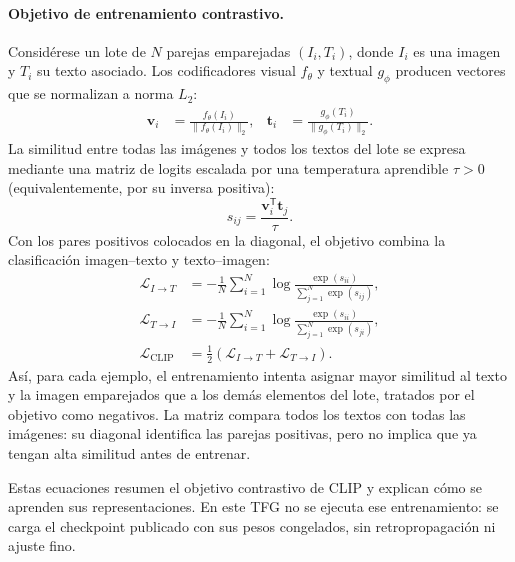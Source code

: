 \paragraph{Objetivo de entrenamiento contrastivo.}
Considérese un lote de \(N\) parejas emparejadas \((I_i,T_i)\), donde \(I_i\) es una imagen y \(T_i\) su texto asociado. Los codificadores visual \(f_\theta\) y textual \(g_\phi\) producen vectores que se normalizan a norma \(L_2\):
\begin{align}
  \mathbf{v}_i &= \frac{f_\theta(I_i)}{\lVert f_\theta(I_i)\rVert_2},
  &
  \mathbf{t}_i &= \frac{g_\phi(T_i)}{\lVert g_\phi(T_i)\rVert_2}.
  \label{eq:clip-normalizacion}
\end{align}
La similitud entre todas las imágenes y todos los textos del lote se expresa mediante una matriz de logits escalada por una temperatura aprendible \(\tau>0\) (equivalentemente, por su inversa positiva):
\begin{equation}
  s_{ij}=\frac{\mathbf{v}_i^{\mathsf T}\mathbf{t}_j}{\tau}.
  \label{eq:clip-logits}
\end{equation}
Con los pares positivos colocados en la diagonal, el objetivo combina la clasificación imagen--texto y texto--imagen:
\begin{align}
  \mathcal{L}_{I\to T}
  &=-\frac{1}{N}\sum_{i=1}^{N}
    \log\frac{\exp(s_{ii})}{\sum_{j=1}^{N}\exp(s_{ij})},
  \\
  \mathcal{L}_{T\to I}
  &=-\frac{1}{N}\sum_{i=1}^{N}
    \log\frac{\exp(s_{ii})}{\sum_{j=1}^{N}\exp(s_{ji})},
  \\
  \mathcal{L}_{\mathrm{CLIP}}
  &=\frac{1}{2}\left(\mathcal{L}_{I\to T}+\mathcal{L}_{T\to I}\right).
  \label{eq:clip-perdida}
\end{align}
Así, para cada ejemplo, el entrenamiento intenta asignar mayor similitud al texto y la imagen emparejados que a los demás elementos del lote, tratados por el objetivo como negativos. La matriz compara todos los textos con todas las imágenes: su diagonal identifica las parejas positivas, pero no implica que ya tengan alta similitud antes de entrenar.

Estas ecuaciones resumen el objetivo contrastivo de CLIP y explican cómo se aprenden sus representaciones. En este TFG no se ejecuta ese entrenamiento: se carga el checkpoint publicado con sus pesos congelados, sin retropropagación ni ajuste fino.

